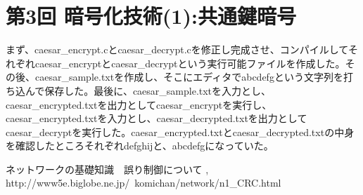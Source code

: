 \documentclass[a4j]{celb-report}
\begin{document}
\newpage
\section{第3回 暗号化技術(1):共通鍵暗号}
まず、caesar\_encrypt.cとcaesar\_decrypt.cを修正し完成させ、コンパイルしてそれぞれcaesar\_encryptとcaesar\_decryptという実行可能ファイルを作成した。その後、caesar\_sample.txtを作成し、そこにエディタでabcdefgという文字列を打ち込んで保存した。最後に、caesar\_sample.txtを入力とし、caesar\_encrypted.txtを出力としてcaesar\_encryptを実行し、caesar\_encrypted.txtを入力とし、caesar\_decrypted.txtを出力としてcaesar\_decryptを実行した。caesar\_encrypted.txtとcaesar\_decrypted.txtの中身を確認したところそれぞれdefghijと、abcdefgになっていた。

\begin{thebibliography}{9}
 ネットワークの基礎知識　誤り制御について , http://www5e.biglobe.ne.jp/~komichan/network/n1\_CRC.html
\end{thebibliography}
%
\end{document}
